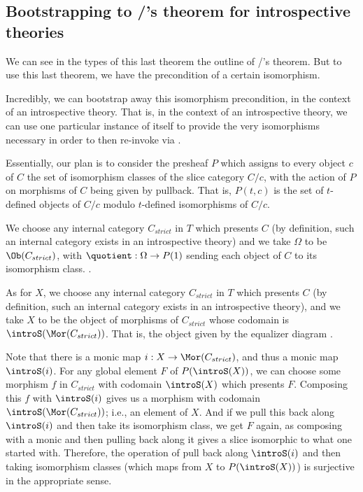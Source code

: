 \subsection{Bootstrapping to \Loeb/'s theorem for introspective theories}
We can see in the types of this last theorem the outline of \Loeb/'s theorem. But to use this last theorem, we have the precondition of a certain isomorphism.

Incredibly, we can bootstrap away this isomorphism precondition, in the context of an introspective theory. That is, in the context of an introspective theory, we can use one particular instance of  itself to provide the very isomorphisms necessary in order to then re-invoke  via .

Essentially, our plan is to consider the presheaf $P$ which assigns to every object $c$ of $C$ the set of isomorphism classes of the slice category $C/c$, with the action of $P$ on morphisms of $C$ being given by pullback. That is, $P(t, c)$ is the set of $t$-defined objects of $C/c$ modulo $t$-defined isomorphisms of $C/c$. \TODO

We choose any internal category $C_{strict}$ in $T$ which presents $C$ (by definition, such an internal category exists in an introspective theory) and we take $\Omega$ to be $\Ob(C_{strict})$, with $\quotient : \Omega \to P(1)$ sending each object of $C$ to its isomorphism class. . 

As for $X$, we choose any internal category $C_{strict}$ in $T$ which presents $C$ (by definition, such an internal category exists in an introspective theory), and we take $X$ to be the object of morphisms of $C_{strict}$ whose codomain is $\introS(\Mor(C_{strict}))$. That is, the object given by the equalizer diagram \TODO.

Note that there is a monic map $i : X \to \Mor(C_{strict})$, and thus a monic map $\introS(i)$. For any global element $F$ of $P(\introS(X))$, we can choose some morphism $f$ in $C_{strict}$ with codomain $\introS(X)$ which presents $F$. Composing this $f$ with $\introS(i)$ gives us a morphism with codomain $\introS(\Mor(C_{strict}))$; i.e., an element of $X$. And if we pull this back along $\introS(i)$ and then take its isomorphism class, we get $F$ again, as composing with a monic and then pulling back along it gives a slice isomorphic to what one started with. Therefore, the operation of pull back along $\introS(i)$ and then taking isomorphism classes (which maps from $X$ to $P(\introS(X))$) is surjective in the appropriate sense. \TODO


